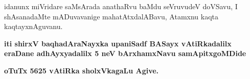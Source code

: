 \begin{artha}
idanunx miVridare saMsArada anathaRvu baMdu seVruvudeV doVSavu, I shAsanadaMte mADuvavanige mahatAtxdalABavu, Atamxnu kaqta kaqtayxnAguvanu.
\end{artha}

\begin{center}
\textbf{iti shirxV baqhadAraNayxka upaniSadf BASayx vAtiRkadalilx eraDane
adhAyxyadalilx 5 neV bArxhamxNavu samApitxgoMDide}

\medskip
\textbf{oTuTx 5625 vAtiRka sholxVkagaLu Agive.}
\end{center}
